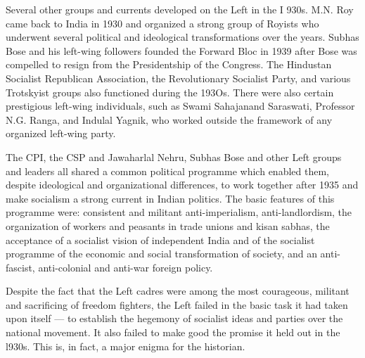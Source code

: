 \begin{multicols}{2}
Several other groups and currents developed on the Left in the I 930s. M.N. Roy came back to India in 1930 and organized a strong group of Royists who underwent several political and ideological transformations over the years. Subhas Bose and his left-wing followers founded the Forward Bloc in 1939 after Bose was compelled to resign from the Presidentship of the Congress. The Hindustan Socialist Republican Association, the Revolutionary Socialist Party, and various Trotskyist groups also functioned during the 193Os. There were also certain prestigious left-wing individuals, such as Swami Sahajanand Saraswati, Professor N.G. Ranga, and Indulal Yagnik, who worked outside the framework of any organized left-wing party. 

The CPI, the CSP and Jawaharlal Nehru, Subhas Bose and other Left groups and leaders all shared a common political programme which enabled them, despite ideological and organizational differences, to work together after 1935 and make socialism a strong current in Indian politics. The basic features of this programme were: consistent and militant anti-imperialism, anti-landlordism, the organization of workers and peasants in trade unions and kisan sabhas, the acceptance of a socialist vision of independent India and of the socialist programme of the economic and social transformation of society, and an anti-fascist, anti-colonial and anti-war foreign policy. 

Despite the fact that the Left cadres were among the most courageous, militant and sacrificing of freedom fighters, the Left failed in the basic task it had taken upon itself --- to establish the hegemony of socialist ideas and parties over the national movement. It also failed to make good the promise it held out in the l930s. This is, in fact, a major enigma for the historian. 


\end{multicols}

